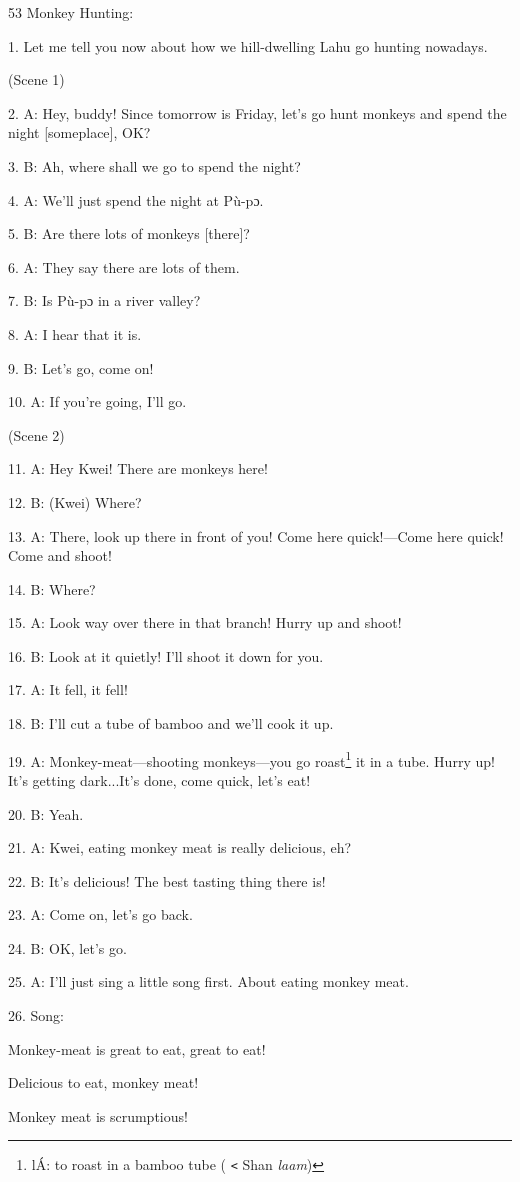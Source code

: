 
53 Monkey Hunting:

1. Let me tell you now about how we hill-dwelling Lahu go hunting nowadays.

(Scene 1)

2. A: Hey, buddy!  Since tomorrow is Friday, let's go hunt monkeys and spend the
night [someplace], OK?

3. B: Ah, where shall we go to spend the night?

4. A: We'll just spend the night at Pù-pɔ.

5. B: Are there lots of monkeys [there]?

6. A: They say there are lots of them.

7. B: Is Pù-pɔ in a river valley?

8. A: I hear that it is.

9. B: Let's go, come on!

10. A: If you're going, I'll go.

(Scene 2)

11. A: Hey Kwei!  There are monkeys here!

12. B: (Kwei) Where?

13. A: There, look up there in front of you!  Come here quick!---Come here quick!
Come and shoot!

14. B: Where?

15. A: Look way over there in that branch!  Hurry up and shoot!

16. B: Look at it quietly!  I'll shoot it down for you.

17. A: It fell, it fell!

18. B: I'll cut a tube of bamboo and we'll cook it up.

19. A: Monkey-meat---shooting monkeys---you go roast\footnote{lÁ: to roast in a bamboo tube ( \texttt{<} Shan \textit{laam})} it in a tube.  Hurry up!
It's getting dark...It's done, come quick, let's eat!

20. B: Yeah.

21. A: Kwei, eating monkey meat is really delicious, eh?

22. B: It's delicious!  The best tasting thing there is!

23. A: Come on, let's go back.

24. B: OK, let's go.

25. A: I'll just sing a little song first.  About eating monkey meat.

26. Song:

Monkey-meat is great to eat, great to eat!

Delicious to eat, monkey meat!

Monkey meat is scrumptious!

